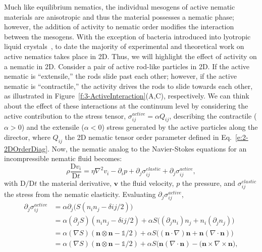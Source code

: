 Much like equilibrium nematics, the individual mesogens of active nematic materials are anisotropic and thus the material possesses a nematic phase; however, the addition of activity to nematic order modifies the interaction between the mesogens.
With the exception of bacteria introduced into lyotropic liquid crystals~\cite{RN86}, to date the majority of experimental and theoretical work on active nematics takes place in 2D.
Thus, we will highlight the effect of activity on a nematic in 2D.
Consider a pair of active rod-like particles in 2D.
If the active nematic is ``extensile,'' the rods slide past each other; however, if the active nematic is ``contractile,'' the activity drives the rods to slide towards each other, as illustrated in Figure~\ref{f:3-ActiveInteraction}(A,C), respectively.
We can think about the effect of these interactions at the continuum level by considering the active contribution to the stress tensor, $\sigma^{active}_{ij} = \alpha Q_{ij}$, describing the contractile ($\alpha > 0$) and the extensile ($\alpha < 0$) stress generated by the active particles along the director, where $Q_{ij}$ the 2D nematic tensor order parameter defined in Eq.~\ref{e:2-2DOrderDiag}.
Now, the nematic analog to the Navier-Stokes equations for an incompressible nematic fluid becomes:
\begin{equation}
  \rho \frac{\textrm{D} v_i}{\textrm{D}t } = \eta \nabla^2 v_i - \partial_i p + \partial_j \sigma_{ij}^{elastic} + \partial_j \sigma_{ij}^{active},\label{e:3-NavierStokes}
\end{equation}
with $\textrm{D}/\textrm{D}t$ the material derivative, $\mathbf{v}$ the fluid velocity, $p$ the pressure, and $\sigma_{ij}^{elastic}$ the stress from the nematic elasticity.
Evaluating $\partial_j \sigma^{active}_{ij}$,
\label{e:3-ActiveInstability}
\begin{align}
  \partial_j \sigma^{active}_{ij} &= \alpha \partial_j \big(S(n_in_j - \delta{ij}/2)\big)\tag{\theequation a} \\
  &= \alpha(\partial_j S)(n_in_j - \delta{ij}/2) + \alpha S \big((\partial_j n_i)n_j + n_i(\partial_j n_j) \big)\tag{\theequation b} \\
  &= \alpha (\nabla S)(\mathbf{n} \otimes \mathbf{n}-\mathbb{1}/2) + \alpha S \big((\mathbf{n} \cdot \nabla)\mathbf{n} + \mathbf{n}(\nabla \cdot \mathbf{n}) \big)\tag{\theequation c} \\
  &=  \alpha (\nabla S)(\mathbf{n} \otimes \mathbf{n}-\mathbb{1}/2) + \alpha S \big(\mathbf{n}(\nabla \cdot \mathbf{n}) - (\mathbf{n} \times \nabla \times \mathbf{n}  \big),\tag{\theequation d}
\end{align}
